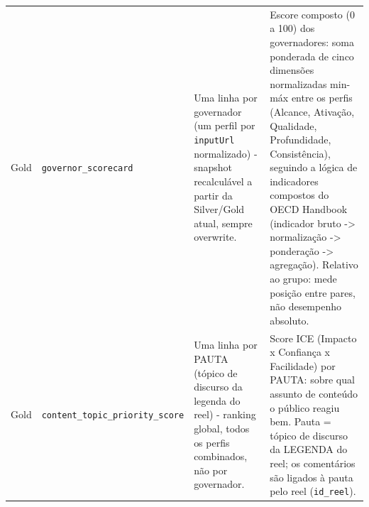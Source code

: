 \begin{footnotesize}
\begin{longtable}{p{1.2cm}p{3.4cm}p{3.6cm}p{6.0cm}}
Gold & \texttt{governor\_\allowbreak{}scorecard} & Uma linha por governador (um perfil por \texttt{inputUrl} normalizado) - snapshot recalculável a partir da Silver/\allowbreak{}Gold atual, sempre overwrite. & Escore composto (0 a 100) dos governadores: soma ponderada de cinco dimensões normalizadas min-máx entre os perfis (Alcance, Ativação, Qualidade, Profundidade, Consistência), seguindo a lógica de indicadores compostos do OECD Handbook (indicador bruto -> normalização -> ponderação -> agregação). Relativo ao grupo: mede posição entre pares, não desempenho absoluto. \\
Gold & \texttt{content\_\allowbreak{}topic\_\allowbreak{}priority\_\allowbreak{}score} & Uma linha por PAUTA (tópico de discurso da legenda do reel) - ranking global, todos os perfis combinados, não por governador. & Score ICE (Impacto x Confiança x Facilidade) por PAUTA: sobre qual assunto de conteúdo o público reagiu bem. Pauta = tópico de discurso da LEGENDA do reel; os comentários são ligados à pauta pelo reel (\texttt{id\_\allowbreak{}reel}). \\
\end{longtable}
\end{footnotesize}


